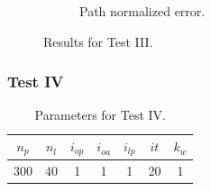 \begin{figure}[htbp!]
\begin{subfigure}[b]{\errorWidth\textwidth}
        \caption{Path normalized error.}
        \label{fig:test-iiib}
    \end{subfigure}
    \caption{Results for Test III.}
    \label{fig:test-iii}
\end{figure}
\clearpage

\subsubsection{Test IV}
\label{sec:test-iv}

\begin{table}[htbp!]
    \centering
    \begin{tabular}{|c|c|c|c|c|c|c|}
        \hline
        $n_p$ & $n_l$ & $i_{op}$ & $i_{oa}$ & $i_{lp}$ & $it$ & $k_w$\\
        \hline \hline
        300 & 40 & 1 & 1 & 1 & 20 & 1\\
        \hline 
    \end{tabular}
    \caption{Parameters for Test IV.}
    \label{tab:test-iv}
\end{table}

